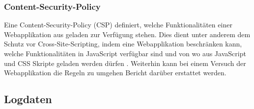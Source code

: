 \subsubsection{Content-Security-Policy}


Eine Content-Security-Policy (CSP) definiert, welche Funktionalitäten einer Webapplikation aus geladen zur Verfügung stehen. Dies dient unter anderem dem Schutz vor Cross-Site-Scripting, indem eine Webapplikation beschränken kann, welche Funktionalitäten in JavaScript verfügbar sind und von wo aus JavaScript und CSS Skripte geladen werden dürfen \cite{MDNContentSecurityPolicy}. Weiterhin kann bei einem Versuch der Webapplikation die Regeln zu umgehen Bericht darüber erstattet werden.


%
%
%
%

\subsection{Logdaten}
\label{sec:logdaten}

